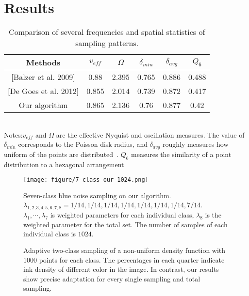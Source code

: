 \section{Results}

\begin{table}
\caption{\label{comparing-table}
Comparison of several frequencies and spatial statistics of sampling patterns.
}

 \begin{tabular}{c|c|c|c|c|c}

  \hline
   Methods & $v_{eff}$ & $\Omega$ & $\delta_{min}$ & $\delta_{avg}$ & $Q_6$ \\ \hline
  {[Balzer et al. 2009]}& 0.88& 2.395 & 0.765 & 0.886 & 0.488 \\
  {[De Goes et al. 2012]} & 0.855 & 2.014 & 0.739 & 0.872 & 0.417 \\
   Our algorithm & 0.865 & 2.136 & 0.76 & 0.877 & 0.42 \\ \hline
  \end{tabular}\\
  Notes:$v_{eff} $ and $\Omega$ are the effective Nyquist and oscillation measures.
The value of $\delta_{min}$ corresponds to the Poisson disk radius,
and $\delta_{avg}$ roughly measures how uniform of the points are distributed~\cite{schlomer:2011:farthest}.
$Q_6$ measures the similarity of a point distribution to a hexagonal arrangement~\cite{kansal:2000:nonequilibrium}
\end{table}

\begin{figure*}[htb]
  \centering
  \texttt{[image: figure/7-class-our-1024.png]}

  \caption{Seven-class blue noise sampling on our algorithm.
  $\lambda_{1,2,3,4,5,6,7,8}=1/14,1/14,1/14,1/14,1/14,1/14,1/14,7/14$.
  $\lambda_1,\cdots,\lambda_7$ is weighted parameters for each individual class,
  $\lambda_8$ is the weighted parameter for the total set.
  The number of samples of each individual class is $1024$.}\label{seven-class-sampling}
\end{figure*}

\begin{figure}[htb]
  \centering
  \caption{Adaptive two-class sampling of a non-uniform density function with 1000 points for each class.
  The percentages in each quarter indicate ink density of different color in the image. In contrast,
  our results show precise adaptation for every single sampling and total sampling.}\label{adaptive sampling}
\end{figure}

